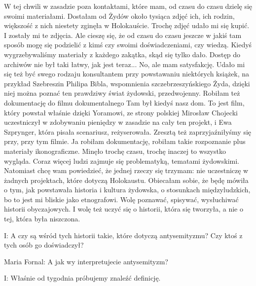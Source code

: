 {W tej chwili w zasadzie poza kontaktami, które mam, od czasu do czasu dzielę się swoimi materiałami. Dostałam od Żydów około tysiąca zdjęć ich, ich rodzin, większość z nich niestety zginęła w Holokauście. Trochę zdjęć udało mi się kupić. I zostały mi te zdjęcia. Ale cieszę się, że od czasu do czasu jeszcze w jakiś tam sposób mogę się podzielić z kimś czy swoimi doświadczeniami, czy wiedzą. Kiedyś wygrzebywaliśmy materiały z każdego zakątka, skąd się tylko dało. Dostęp do archiwów nie był taki łatwy, jak jest teraz... No, ale mam satysfakcję. Udało mi się też być swego rodzaju konsultantem przy powstawaniu niektórych książek, na przykład Szebreszin Philipa Bibla, wspomnienia szczebrzeszyńskiego Żyda, dzięki niej można poznać ten prawdziwy świat żydowski, przedwojenny. Robiłam też dokumentację do filmu dokumentalnego Tam był kiedyś nasz dom. To jest film, który powstał właśnie dzięki Yoramowi, ze strony polskiej Mirosław Chojecki uczestniczył w zdobywaniu pieniędzy w zasadzie na cały ten projekt, i Ewa Szprynger, która pisała scenariusz, reżyserowała. Zresztą też zaprzyjaźniłyśmy się przy, przy tym filmie. Ja robiłam dokumentację, robiłam takie rozpoznanie plus materiały ikonograficzne. Minęło trochę czasu, trochę inaczej to wszystko wygląda. Coraz więcej ludzi zajmuje się problematyką, tematami żydowskimi. Natomiast chcę wam powiedzieć, że jednej rzeczy się trzymam: nie uczestniczę w żadnych projektach, które dotyczą Holokaustu. Obiecałam sobie, że będę mówiła o tym, jak powstawała historia i kultura żydowska, o stosunkach międzyludzkich, bo to jest mi bliskie jako etnografowi. Wolę poznawać, spisywać, wysłuchiwać historii obyczajowych. I wolę też uczyć się o historii, która się tworzyła, a nie o tej, która była niszczona.  

I: A czy są wśród tych historii takie, które dotyczą antysemityzmu? Czy ktoś z tych osób go doświadczył?  

Maria Fornal: A jak wy interpretujecie antysemityzm? 

I: Właśnie od tygodnia próbujemy znaleźć definicję. 

}
